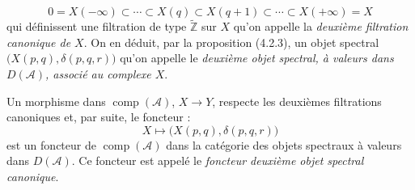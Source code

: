 \begin{equation}
0=X(-\infty)\subset\cdots\subset X(q)\subset X(q+1)
\subset\cdots\subset X(+\infty)=X
\tag{4.3.1.2}
\end{equation}
qui définissent une filtration de type $\widetilde{\mathbb Z}$ sur $X$
qu'on appelle la \emph{deuxième filtration canonique de $X$}. On en déduit,
par la proposition (4.2.3), un objet spectral
$\bigl(X(p,q),\delta(p,q,r)\bigr)$ qu'on appelle le \emph{deuxième objet
spectral, à valeurs dans $D(\mathcal A)$, associé au complexe $X$}.

Un morphisme dans $\operatorname{comp}(\mathcal A)$,
$X\longrightarrow Y$, respecte les deuxièmes filtrations canoniques et,
par suite, le foncteur :
\[
X\longmapsto\bigl(X(p,q),\delta(p,q,r)\bigr)
\]
est un foncteur de $\operatorname{comp}(\mathcal A)$ dans la catégorie des
objets spectraux à valeurs dans $D(\mathcal A)$. Ce foncteur est appelé le
\emph{foncteur deuxième objet spectral canonique}.
\endgroup
